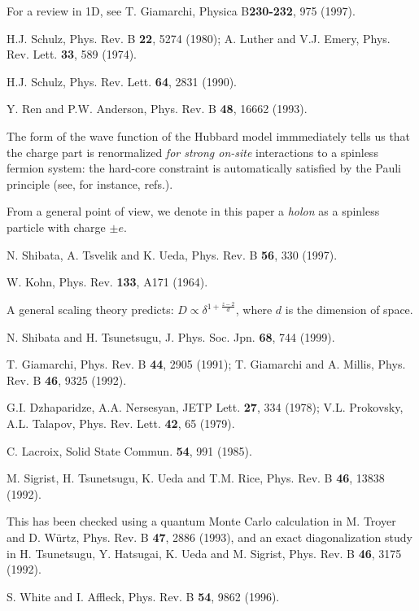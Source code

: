 \begin{references}
For a review in 1D, see T. Giamarchi, Physica B{\bf 230-232}, 975 (1997).

H.J. Schulz, Phys. Rev. B {\bf 22}, 5274 (1980); A. Luther and V.J. Emery,
Phys. Rev. Lett. {\bf 33}, 589 (1974).

H.J. Schulz, Phys. Rev. Lett. {\bf 64}, 2831 (1990).

Y. Ren and P.W. Anderson, Phys. Rev. B {\bf 48}, 16662 (1993).

The form of the wave function of the Hubbard model immmediately tells us
that the charge part is renormalized {\it for strong on-site} interactions to
a spinless fermion system: the hard-core constraint is automatically satisfied
by the Pauli principle (see, for instance,
refs.\cite{Lieb-Wu,Schulz3,Anderson-Ren}).

From a general point of view, we denote in this paper
a {\it holon} as a spinless particle with
charge $\pm e$. 

N. Shibata, A. Tsvelik and K. Ueda, Phys. Rev. B {\bf 56}, 330 (1997).

W. Kohn, Phys. Rev. {\bf 133}, A171 (1964).

A general scaling theory predicts: $D\propto \delta^{1+\frac{z-2}{d}}$, where
$d$ is the dimension of space.

N. Shibata and H. Tsunetsugu, J. Phys. Soc. Jpn. {\bf 68}, 744 (1999).

T. Giamarchi, Phys. Rev. B {\bf 44}, 2905 (1991); T. Giamarchi and A. Millis, 
Phys. Rev. B {\bf 46}, 9325 (1992).

G.I. Dzhaparidze, A.A. Nersesyan, JETP Lett. {\bf 27}, 334
(1978); V.L. Prokovsky, A.L. Talapov, Phys. Rev. Lett. {\bf 42}, 65 (1979).

C. Lacroix, Solid State Commun. {\bf 54}, 991 (1985).

M. Sigrist, H. Tsunetsugu, K. Ueda and T.M. Rice, Phys. Rev. B {\bf 46}, 13838
(1992).

This has been checked using
a quantum Monte Carlo calculation in
M. Troyer and D. W\"urtz, Phys. Rev. B {\bf 47}, 2886 (1993), and an exact
diagonalization study in H. Tsunetsugu, Y. Hatsugai, K. Ueda and M. Sigrist,
Phys. Rev. B {\bf 46}, 3175 (1992).

S. White and I. Affleck,  Phys. Rev. B {\bf 54}, 9862 (1996).


\end{references}
